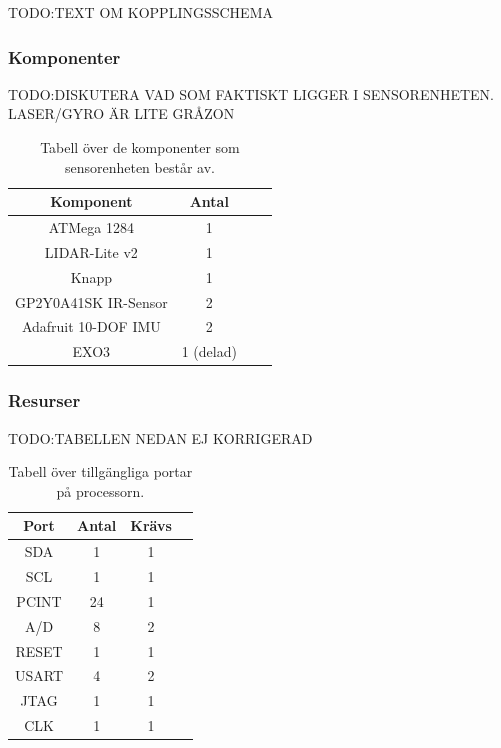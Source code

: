 \documentclass{article}
\begin{document}
TODO:TEXT OM KOPPLINGSSCHEMA

\subsubsection{Komponenter}

TODO:DISKUTERA VAD SOM FAKTISKT LIGGER I SENSORENHETEN. LASER/GYRO ÄR LITE GRÅZON
\begin{table}[H]
  \centering
  \begin{tabular}{ | c | c | c | c |}
    \hline
    \textbf{Komponent} & \textbf{Antal} \\
    \hline
    ATMega 1284 & 1 \\
    \hline
    LIDAR-Lite v2 & 1 \\
    \hline
    Knapp & 1 \\
    \hline
    GP2Y0A41SK IR-Sensor & 2 \\
    \hline
    Adafruit 10-DOF IMU & 2 \\
    \hline
    EXO3 & 1 (delad) \\
    \hline
  \end{tabular}
  \caption{ Tabell över de komponenter som sensorenheten består av. }
\end{table}

\subsubsection{Resurser}

TODO:TABELLEN NEDAN EJ KORRIGERAD
\begin{table}[H]
  \centering
  \begin{tabular}{ | c | c | c | c |}
    \hline
    \textbf{Port} & \textbf{Antal} & \textbf{Krävs} \\
    \hline
    SDA & 1 & 1 \\
    \hline
    SCL & 1 & 1 \\
    \hline
    PCINT & 24 & 1 \\
    \hline
    A/D & 8 & 2 \\
    \hline
    RESET & 1 & 1 \\
    \hline
    USART & 4 & 2 \\
    \hline
    JTAG & 1 & 1 \\
    \hline
    CLK & 1 & 1 \\
    \hline
  \end{tabular}
  \caption{Tabell över tillgängliga portar på processorn.}
\end{table}
\end{document}
